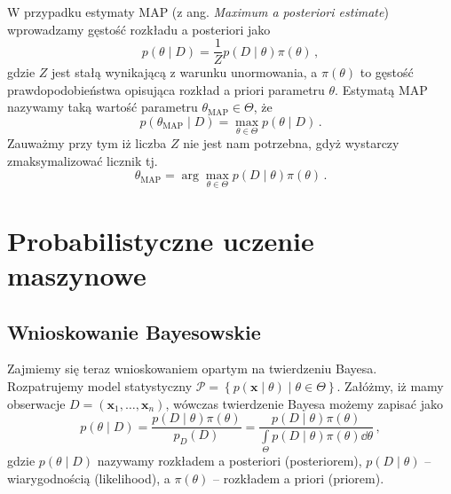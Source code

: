 \documentclass{myclass}
\begin{document}
W przypadku estymaty MAP (z ang. \textit{Maximum a posteriori estimate}) wprowadzamy gęstość
rozkładu a posteriori jako
\begin{equation*}
    p(\theta \mid D) = \frac{1}{Z}p(D \mid \theta)\pi(\theta)\,,
\end{equation*}
gdzie \(Z\) jest stałą wynikającą z warunku unormowania, a \(\pi(\theta)\) to gęstość
prawdopodobieństwa opisująca rozkład a priori parametru \(\theta\). Estymatą MAP nazywamy taką
wartość parametru \(\theta_\text{MAP} \in \Theta\), że
\begin{equation*}
    p(\theta_\text{MAP} \mid D) = \max_{\theta \in \Theta} p(\theta \mid D)\,.
\end{equation*}
Zauważmy przy tym iż liczba \(Z\) nie jest nam potrzebna, gdyż wystarczy zmaksymalizować licznik tj.
\begin{equation*}
    \theta_\text{MAP} = \arg\max_{\theta \in \Theta} p(D \mid \theta)\pi(\theta)\,.
\end{equation*}

\section{Probabilistyczne uczenie maszynowe}

\subsection{Wnioskowanie Bayesowskie}

Zajmiemy się teraz wnioskowaniem opartym na twierdzeniu Bayesa. Rozpatrujemy model statystyczny
\(\mathcal{P} = \left\{p(\mathbf{x} \mid \theta) \mid \theta \in \Theta\right\}\). Załóżmy, iż mamy
obserwacje \(D = (\mathbf{x}_1, \ldots, \mathbf{x}_n)\), wówczas twierdzenie Bayesa możemy zapisać
jako
\begin{equation*}
    p(\theta \mid D) = \frac{p(D \mid \theta)\pi(\theta)}{p_D(D)} = \frac{p(D \mid \theta)\pi(\theta)}{\int\limits_\Theta p(D \mid \theta)\pi(\theta) \dd{\theta}}\,,
\end{equation*}
gdzie \(p(\theta \mid D)\) nazywamy rozkładem a posteriori (posteriorem), \(p(D \mid \theta)\) --
wiarygodnością (likelihood), a \(\pi(\theta)\) -- rozkładem a priori (priorem).
\end{document}
